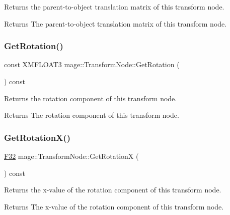 Returns the parent-\/to-\/object translation matrix of this transform node.

\begin{DoxyReturn}{Returns}
The parent-\/to-\/object translation matrix of this transform node. 
\end{DoxyReturn}
\hypertarget{structmage_1_1_transform_node_ae785911d718434387199a92c6966a9b7}{}\label{structmage_1_1_transform_node_ae785911d718434387199a92c6966a9b7} 
\subsubsection{\texorpdfstring{Get\+Rotation()}{GetRotation()}}
{\footnotesize\ttfamily const X\+M\+F\+L\+O\+A\+T3 mage\+::\+Transform\+Node\+::\+Get\+Rotation (\begin{DoxyParamCaption}{ }\end{DoxyParamCaption}) const\hspace{0.3cm}{\ttfamily [noexcept]}}

Returns the rotation component of this transform node.

\begin{DoxyReturn}{Returns}
The rotation component of this transform node. 
\end{DoxyReturn}
\hypertarget{structmage_1_1_transform_node_a716a289997267d8bcda1da28cb679dcc}{}\label{structmage_1_1_transform_node_a716a289997267d8bcda1da28cb679dcc} 
\subsubsection{\texorpdfstring{Get\+Rotation\+X()}{GetRotationX()}}
{\footnotesize\ttfamily \hyperlink{namespacemage_aa97e833b45f06d60a0a9c4fc22ae02c0}{F32} mage\+::\+Transform\+Node\+::\+Get\+RotationX (\begin{DoxyParamCaption}{ }\end{DoxyParamCaption}) const\hspace{0.3cm}{\ttfamily [noexcept]}}

Returns the x-\/value of the rotation component of this transform node.

\begin{DoxyReturn}{Returns}
The x-\/value of the rotation component of this transform node. 
\end{DoxyReturn}
\hypertarget{structmage_1_1_transform_node_a620a6a7d11b3541f17e0492fdf48d9ab}{}\label{structmage_1_1_transform_node_a620a6a7d11b3541f17e0492fdf48d9ab} 
